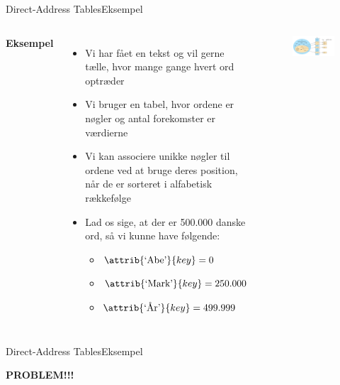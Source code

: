 \documentclass[aspectratio=1610]{beamer}
\begin{document}
\begin{frame}{Direct-Address Tables}{Eksempel}

    \begin{columns}
        \small
        \textbf{Eksempel}
        \begin{itemize}[<+(1)->]
            \item Vi har fået en tekst og vil gerne tælle, hvor mange gange
                hvert ord optræder
            \item Vi bruger en tabel, hvor ordene er nøgler og antal forekomster
                er værdierne
            \item Vi kan associere unikke nøgler til ordene ved at bruge deres
                position, når de er sorteret i alfabetisk rækkefølge
            \item Lad os sige, at der er 500.000 danske ord, så vi kunne have
                følgende:
                \begin{itemize}
                    \item $\attrib{\text{`Abe'}}{key} = 0$ 
                    \item $\attrib{\text{`Mark'}}{key} = 250.000$
                    \item $\attrib{\text{`År'}}{key} = 499.999$ 
                \end{itemize}
        \end{itemize}
    
        \begin{figure}[h]
            \centering
            \includegraphics[width=\textwidth]{direct-address-table}
        \end{figure}
    \end{columns}
\end{frame}

\begin{frame}{Direct-Address Tables}{Eksempel}
    \begin{center}
        \textbf{PROBLEM!!!}
    \end{center}
\end{frame}
\end{document}
